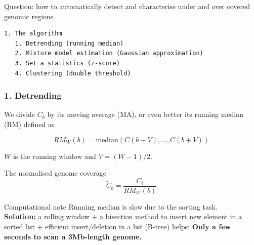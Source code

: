 \documentclass{beamer}
\begin{document}
\begin{frame}
\LARGE
\begin{block}{Question: how to automatically detect and characterise under and 
over covered genomic regions}
\end{block}

\end{frame}


\begin{frame}[fragile]
 \begin{verbatim}
1. The algorithm
   1. Detrending (running median)
   2. Mixture model estimation (Gaussian approximation)
   3. Set a statistics (z-score)
   4. Clustering (double threshold)

\end{verbatim}
\end{frame}


\begin{frame}
\frametitle{1. Detrending}
 
We divide $C_b$ by its moving average (MA), or even better its 
running median (RM) defined as 

\begin{equation}
RM_W(b) = \textrm{median}\left({C(b-V), \dots , C(b+V)}\right) \nonumber
\end{equation}

$W$ is the running window and $V=(W-1)/2$.

\begin{block}{The normalised genome coverage}
\begin{equation}
\widetilde{C}_b = \frac{C_b}{RM_W(b)}  \nonumber
\end{equation}
\end{block}

\pause

\begin{block}{Computational note}
Running median is slow due to the sorting task. \\
\textbf{Solution:} a rolling window + a bisection method to insert 
new element in a sorted list + efficient insert/deletion in a 
list (B-tree) helps:  \textbf{Only a few seconds to scan a 3Mb-length genome.}
\end{block} 
\end{frame}
\end{document}
